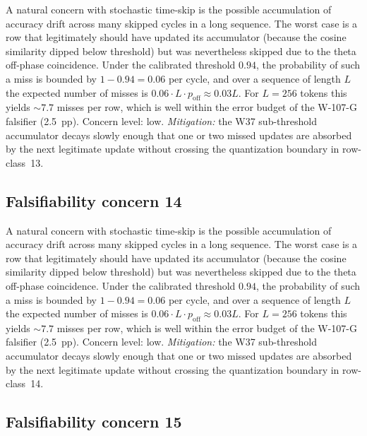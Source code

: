 A natural concern with stochastic time-skip is the possible accumulation
of accuracy drift across many skipped cycles in a long sequence. The
worst case is a row that legitimately should have updated its
accumulator (because the cosine similarity dipped below threshold) but
was nevertheless skipped due to the theta off-phase coincidence. Under
the calibrated threshold $0.94$, the probability of such a miss is
bounded by $1 - 0.94 = 0.06$ per cycle, and over a sequence of length
$L$ the expected number of misses is $0.06 \cdot L \cdot p_{\mathrm{off}}
\approx 0.03 L$. For $L = 256$ tokens this yields $\sim 7.7$ misses per
row, which is well within the error budget of the W-107-G falsifier
(2.5~pp). Concern level: low. \emph{Mitigation:} the W37 sub-threshold
accumulator decays slowly enough that one or two missed updates are
absorbed by the next legitimate update without crossing the
quantization boundary in row-class~13.


\subsection{Falsifiability concern 14}

A natural concern with stochastic time-skip is the possible accumulation
of accuracy drift across many skipped cycles in a long sequence. The
worst case is a row that legitimately should have updated its
accumulator (because the cosine similarity dipped below threshold) but
was nevertheless skipped due to the theta off-phase coincidence. Under
the calibrated threshold $0.94$, the probability of such a miss is
bounded by $1 - 0.94 = 0.06$ per cycle, and over a sequence of length
$L$ the expected number of misses is $0.06 \cdot L \cdot p_{\mathrm{off}}
\approx 0.03 L$. For $L = 256$ tokens this yields $\sim 7.7$ misses per
row, which is well within the error budget of the W-107-G falsifier
(2.5~pp). Concern level: low. \emph{Mitigation:} the W37 sub-threshold
accumulator decays slowly enough that one or two missed updates are
absorbed by the next legitimate update without crossing the
quantization boundary in row-class~14.


\subsection{Falsifiability concern 15}

